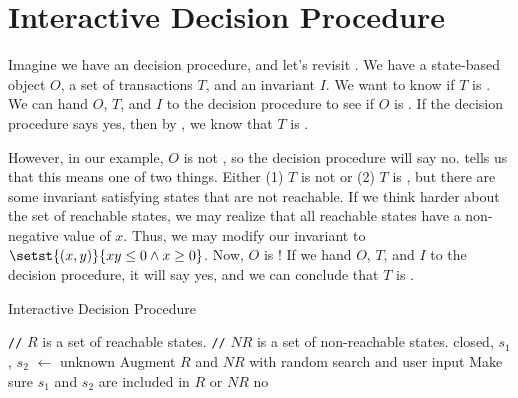 \section{Interactive \Iconfluence{} Decision Procedure}
Imagine we have an \Iclosed{} decision procedure, and let's revisit
. We have a state-based object $O$, a set of
transactions $T$, and an invariant $I$. We want to know if $T$ is
\Iconfluent{}. We can hand $O$, $T$, and $I$ to the \Iclosed{} decision
procedure to see if $O$ is \Iclosed{}. If the decision procedure says yes, then
by , we know that $T$ is \Iconfluent{}.

However, in our example, $O$ is not \Iclosed{}, so the decision procedure will
say no.  tells us that this means one of two
things. Either (1) $T$ is not \Iconfluent{} or (2) $T$ is \Iconfluent{}, but
there are some invariant satisfying states that are not reachable. If we think
harder about the set of reachable states, we may realize that all reachable
states have a non-negative value of $x$. Thus, we may modify our invariant to
$\setst{(x, y)}{xy \leq 0 \land x \geq 0}$. Now, $O$ is \Iclosed{}! If we hand
$O$, $T$, and $I$ to the decision procedure, it will say yes, and we can
conclude that $T$ is \Iconfluent{}.

\newcommand{\comment}[1]{\State \textcolor{flatdenim}{\texttt{//} #1}}
\begin{algorithm}
  \caption{Interactive \Iconfluence{} Decision Procedure}%
  \begin{algorithmic}
      \State \Return {}
    \EndFunction

    \State

    \comment{$R$ is a set of reachable states.}
    \comment{$NR$ is a set of non-reachable states.}
      \State closed, $s_1$, $s_2$ $\gets$
        \State \Return unknown
        \State {}
      \Else
        \State Augment $R$ and $NR$ with random search and user input
        \State Make sure $s_1$ and $s_2$ are included in $R$ or $NR$
          \State \Return no
        \Else
          \State \Return {}
        \EndIf
      \EndIf
    \EndFunction
  \end{algorithmic}
\end{algorithm}

